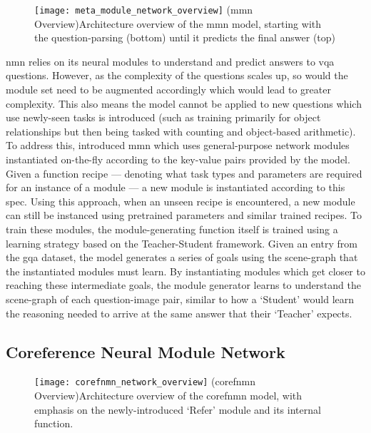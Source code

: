 \begin{figure}[htbp]
    \centering
    \texttt{[image: meta\_module\_network\_overview]}
    \captionsource(\acrshort{mmn} Overview){Architecture overview of the \acrshort{mmn} model, starting with the question-parsing (bottom) until it predicts the final answer (top) \label{fig:mmn_overview}}{\citeauthor{chen_meta_2020}\cite{chen_meta_2020}}
\end{figure}

\gls{nmn} relies on its neural modules to understand and predict answers to \gls{vqa} questions.
However, as the complexity of the questions scales up, so would the module set need to be augmented accordingly which would lead to greater complexity.
This also means the model cannot be applied to new questions which use newly-seen tasks is introduced (such as training primarily for object relationships but then being tasked with counting and object-based arithmetic).
To address this, \citeauthor{chen_meta_2020} introduced \gls{mmn} \cite{chen_meta_2020} which uses general-purpose network modules instantiated on-the-fly according to the key-value pairs provided by the model.
Given a function recipe --- denoting what task types and parameters are required for an instance of a module --- a new module is instantiated according to this spec.
Using this approach, when an unseen recipe is encountered, a new module can still be instanced using pretrained parameters and similar trained recipes.
To train these modules, the module-generating function itself is trained using a learning strategy based on the Teacher-Student framework\cite{chen_meta_2020}.
Given an entry from the \gls{gqa} dataset, the model generates a series of goals using the scene-graph that the instantiated modules must learn.
By instantiating modules which get closer to reaching these intermediate goals, the module generator learns to understand the scene-graph of each question-image pair, similar to how a `Student' would learn the reasoning needed to arrive at the same answer that their `Teacher' expects.

\subsection{Coreference Neural Module Network}
\label{subsec:coreference_neural_module_network}

\begin{figure}[htbp]
    \centering
    \texttt{[image: corefnmn\_network\_overview]}
    \captionsource(\acrshort{corefnmn} Overview){Architecture overview of the \acrshort{corefnmn} model, with emphasis on the newly-introduced `Refer' module and its internal function. \label{fig:corefnmn_overview}}{\citeauthor{kottur_visual_2018}\cite{kottur_visual_2018}}
\end{figure}

